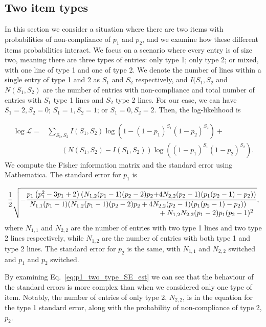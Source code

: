 \documentclass[aoas]{imsart}
\begin{document}
\subsection{Two item types}
In this section we consider a situation where there are two items with probabilities of non-compliance of \(p_1\) and \(p_2\), and we examine how these different items probabilities interact. We focus on a scenario where every entry is of size two, meaning there are three types of entries: only type 1; only type 2; or mixed, with one line of type 1 and one of  type 2. We denote the number of lines within a single entry of type 1 and 2 as \(S_1\) and \(S_2\) respectively, and \(I(S_1,S_2\) and \(N(S_1,S_2)\) are the number of entries with non-compliance and total number of entries with \(S_1\) type 1 lines and \(S_2\) type 2 lines. For our case, we can have \(S_1=2, S_2=0\); \(S_1=1, S_2=1\); or \(S_1=0, S_2=2\). Then, the log-likelihood is

\begin{align}
\log\mathcal{L} =& \sum_{S_1,S_2}{I(S_1,S_2)}\log\left(1-(1-p_1)^{S_1}(1-p_2)^{S_2}\right) + \nonumber
\\ &\quad\quad(N(S_1,S_2)-I(S_1,S_2))\log\left((1-p_1)^{S_1}(1-p_2)^{S_2}\right). \label{eq:entry_mode_loglike_2types}
\end{align}
We compute the Fisher information matrix and the standard error using Mathematica. The standard error for \(p_1\) is

\begin{align}
\frac{1 }
{2}
\sqrt{
-\frac{\textstyle{{p_1} \left(p_1^2-3 p_1+2\right) (N_{1,2} (p_1-1) (p_2-2) p_2}{+4 N_{2,2} (p_2-1) (p_1 (p_2-1)-p_2))}}
{\splitfrac{N_{1,1} (p_1-1) (N_{1,2} (p_1-1) (p_2-2) p_2+4 N_{2,2} (p_2-1) (p_1 (p_2-1)-p_2))}{+N_{1,2} N_{2,2} (p_1-2) p_1 (p_2-1)^2}}
}
,\label{eq:p1_two_type_SE_est}
\end{align}
where \(N_{1,1}\) and \(N_{2,2}\) are the number of entries with two type 1 lines and two type 2 lines respectively, while \(N_{1,2}\) are the number of entries with both type 1 and type 2 lines. The standard error for \(p_2\) is the same, with \(N_{1,1}\) and \(N_{2,2}\) switched and \(p_1\) and \(p_2\) switched. 

By examining Eq.~\eqref{eq:p1_two_type_SE_est} we can see that the behaviour of the standard errors is more complex than when we considered only one type of item. Notably, the number of entries of only type 2, \(N_{2,2}\), is in the equation for the type 1 standard error, along with the probability of non-compliance of type 2, \(p_2\). 
\end{document}
